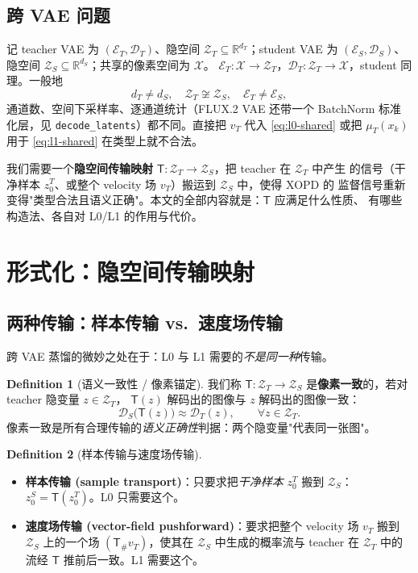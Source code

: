 \documentclass[11pt,a4paper]{article}
\newcommand{\R}{\mathbb{R}}
\newcommand{\Enc}{\mathcal{E}}
\newcommand{\Dec}{\mathcal{D}}
\newcommand{\Xspace}{\mathcal{X}}
\newcommand{\Zt}{\mathcal{Z}_T}
\newcommand{\Zs}{\mathcal{Z}_S}
\newcommand{\Tmap}{\mathsf{T}}
\newcommand{\push}{\#}
\newcommand{\vT}{v_{T}}
\theoremstyle{definition}
\newtheorem{definition}{Definition}
\begin{document}
\subsection{跨 VAE 问题}

记 teacher VAE 为 $(\Enc_T,\Dec_T)$、隐空间 $\Zt\subseteq\R^{d_T}$；student VAE 为
$(\Enc_S,\Dec_S)$、隐空间 $\Zs\subseteq\R^{d_S}$；共享的像素空间为 $\Xspace$。
$\Enc_T:\Xspace\to\Zt$，$\Dec_T:\Zt\to\Xspace$，student 同理。一般地
\[
d_T\neq d_S,\quad
\Zt\not\cong\Zs,\quad
\Enc_T\neq\Enc_S,
\]
通道数、空间下采样率、逐通道统计（FLUX.2 VAE 还带一个 BatchNorm 标准化层，见
\texttt{decode\_latents}）都不同。直接把 $\vT$ 代入 \eqref{eq:l0-shared} 或把
$\mu_T(x_k)$ 用于 \eqref{eq:l1-shared} 在类型上就不合法。

\begin{tcolorbox}[colback=blue!4,colframe=blue!50!black,title=核心问题]
我们需要一个\textbf{隐空间传输映射} $\Tmap:\Zt\to\Zs$，把 teacher 在 $\Zt$ 中产生
的信号（干净样本 $z_0^T$、或整个 velocity 场 $\vT$）搬运到 $\Zs$ 中，使得 XOPD 的
监督信号重新变得"类型合法且语义正确"。本文的全部内容就是：$\Tmap$ 应满足什么性质、
有哪些构造法、各自对 L0/L1 的作用与代价。
\end{tcolorbox}

\section{形式化：隐空间传输映射}
\label{sec:formal}

\subsection{两种传输：样本传输 vs.\ 速度场传输}

跨 VAE 蒸馏的微妙之处在于：L0 与 L1 需要的\emph{不是同一种}传输。

\begin{definition}[语义一致性 / 像素锚定]
我们称 $\Tmap:\Zt\to\Zs$ 是\textbf{像素一致}的，若对 teacher 隐变量 $z\in\Zt$，
$\Tmap(z)$ 解码出的图像与 $z$ 解码出的图像一致：
\begin{equation}
\Dec_S\big(\Tmap(z)\big)\approx \Dec_T(z),
\qquad\forall z\in\Zt.
\label{eq:pixel-consistent}
\end{equation}
像素一致是所有合理传输的\emph{语义正确性}判据：两个隐变量"代表同一张图"。
\end{definition}

\begin{definition}[样本传输与速度场传输]
\leavevmode
\begin{itemize}[leftmargin=1.4em]
\item \textbf{样本传输 (sample transport)}：只要求把\emph{干净样本} $z_0^T$ 搬到
$\Zs$：$z_0^S=\Tmap(z_0^T)$。L0 只需要这个。
\item \textbf{速度场传输 (vector-field pushforward)}：要求把整个 velocity 场
$\vT$ 搬到 $\Zs$ 上的一个场 $(\Tmap_\push \vT)$，使其在 $\Zs$ 中生成的概率流与
teacher 在 $\Zt$ 中的流经 $\Tmap$ 推前后一致。L1 需要这个。
\end{itemize}
\end{definition}
\end{document}

